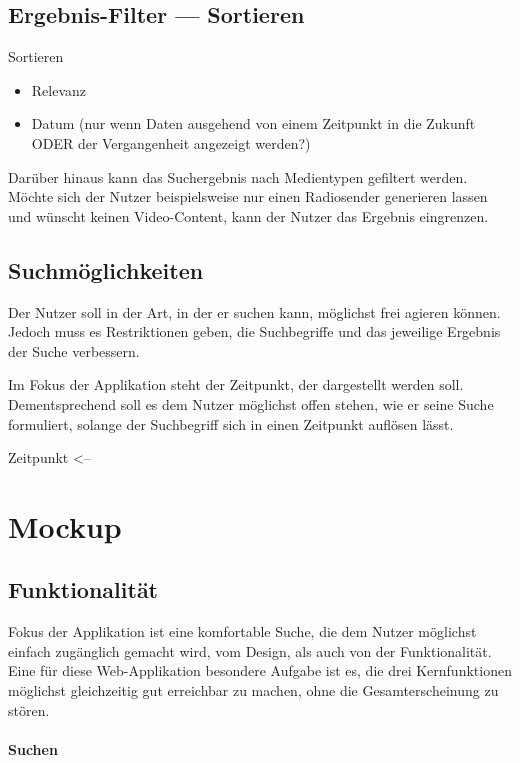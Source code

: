 \subsection{Ergebnis-Filter --- Sortieren}
Sortieren

\begin{itemize}
	\item Relevanz
	\item Datum (nur wenn Daten ausgehend von einem Zeitpunkt in die Zukunft ODER der Vergangenheit angezeigt werden?)
\end{itemize}

Darüber hinaus kann das Suchergebnis nach Medientypen gefiltert werden. Möchte sich der Nutzer beispielsweise nur einen Radiosender generieren lassen und wünscht keinen Video-Content, kann der Nutzer das Ergebnis eingrenzen.

\subsection{Suchmöglichkeiten}
Der Nutzer soll in der Art, in der er suchen kann, möglichst frei agieren können. Jedoch muss es Restriktionen geben, die Suchbegriffe und das jeweilige Ergebnis der Suche verbessern.

Im Fokus der Applikation steht der Zeitpunkt, der dargestellt werden soll. Dementsprechend soll es dem Nutzer möglichst offen stehen, wie er seine Suche formuliert, solange der Suchbegriff sich in einen Zeitpunkt auflösen lässt.


Zeitpunkt <--

\section{Mockup}

\subsection{Funktionalität}
Fokus der Applikation ist eine komfortable Suche, die dem Nutzer möglichst einfach zugänglich gemacht wird, \dahe vom Design, als auch von der Funktionalität. 
Eine für diese Web-Applikation besondere Aufgabe ist es, die drei Kernfunktionen möglichst gleichzeitig gut erreichbar zu machen, ohne die Gesamterscheinung zu stören.
\paragraph{Suchen}

